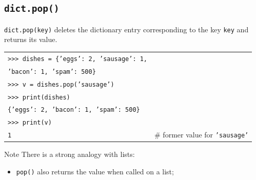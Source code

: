 \documentclass[t,handout,9pt]{beamer}
\begin{document}
\subsection{\texttt{dict.pop()}}
\begin{frame}
\vfill
\texttt{dict.pop(key)} deletes the dictionary entry corresponding to the key \texttt{key} and returns its value.\\
\begin{table}[]
\begin{flushleft}
\begin{tabular}{ll}
\texttt{>{}>{}> dishes = \{'eggs': 2, 'sausage': 1,} &   \\
\texttt{\qquad 'bacon': 1, 'spam': 500\}} &   \\
\texttt{>{}>{}> v = dishes.pop('sausage')} &   \\
\texttt{>{}>{}> print(dishes)} &   \\
\texttt{\{'eggs': 2, 'bacon': 1, 'spam': 500\}} &   \\
\texttt{>{}>{}> print(v)} &   \\
\texttt{1} &  \# former value for \texttt{'sausage'} \\
\end{tabular}
\end{flushleft}
\end{table}
\begin{block}{Note}
There is a strong analogy with lists:
\begin{itemize}
	\item \texttt{pop()} also returns the value when called on a list;
\end{itemize}
\end{block}
\vfill
\end{frame}
%
\end{document}
